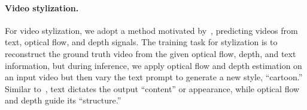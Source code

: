 \vspace{-3mm}
\paragraph{Video stylization.} For video stylization, we adopt a method motivated  by~\cite{zhang2023adding,chen2023control,esser2023structure}, predicting videos from text, optical flow, and depth signals. The training task for stylization is to reconstruct the ground truth video from the given optical flow, depth, and text information, but
during inference, we apply optical flow and depth estimation on an input video but then vary the text prompt to generate a new style, \eg ``cartoon.''
%
%
Similar to~\cite{esser2023structure}, text dictates the output 
``content'' or appearance, while optical flow and depth guide its ``structure.''





